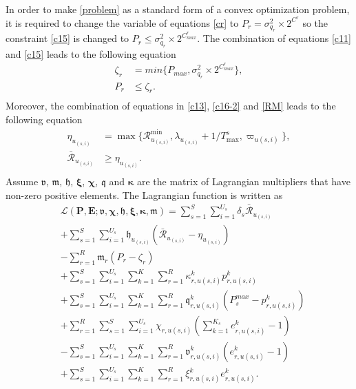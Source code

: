 \documentclass[lettersize,journal]{IEEEtran}
\begin{document}
In order to make \eqref{problem} as a standard form of a convex optimization problem, it is required to change the variable of equations \eqref{cr} to $P_r = \sigma_{q_r}^2\times 2^{C^r}$ so the constraint 
\eqref{c15} is changed to
 $P_r \leq \sigma_{q_r}^2\times 2^{C^r_{max}}$.
The combination of equations \eqref{c11} and \eqref{c15} leads to the following equation
\begin{equation} \label{pr11}
\begin{split}
\zeta_{r}&= min\{P_{max}, \sigma_{q_r}^2\times 2^{C^r_{max}} \}, \\
P_r &\leq  \zeta_{r}.\\
\end{split}
\end{equation} 
Moreover, the combination of equations in \eqref{c13}, \eqref{c16-2} and \eqref{RM} leads to the following equation
\begin{equation}\label{RConstr}
\begin{split}
\eta_{u_{(s,i)}}&= \max\{\mathcal{R}_{u_{(s,i)}}^{\min}, \lambda_{u_{(s,i)}}+1/T^s_{\max}, \varpi_{u(s,i)} \}, \\
\mathcal{\bar{R}}_{u_{(s,i)}} &\geq  \eta_{u_{(s,i)}}.\\
\end{split}
\end{equation}
Assume $\boldsymbol{\mathfrak{v}}$, $\boldsymbol{\mathfrak{m}}$, $\boldsymbol{\mathfrak{h}}$, $\boldsymbol{\xi}$, $\boldsymbol{\chi}$, $\boldsymbol{\mathfrak{q}}$ and $\boldsymbol{ \kappa}$ are the matrix of Lagrangian multipliers that have non-zero positive elements. The Lagrangian function is written as 
\begin{subequations}\label{lagrang}
\begin{alignat}{4}
&\mathcal{L}(\boldsymbol{P},\boldsymbol{E}; \boldsymbol{\mathfrak{v}}, \boldsymbol{\chi}, \boldsymbol{\mathfrak{h}}, \boldsymbol{ \xi}, \boldsymbol{ \kappa}, \boldsymbol{\mathfrak{m}})  = \sum\limits_{s=1}^{S} \sum\limits_{i=1}^{U_s}\delta_s\mathcal{\bar{R}}_{u_{(s,i)}}\\
&+\sum\limits_{s=1}^{S} \sum\limits_{i=1}^{U_s}\mathfrak{h}_{u_{(s,i)}} (\mathcal{\bar{R}}_{u_{(s,i)}}-\eta_{u_{(s,i)}})\\
&-  \sum\limits_{r=1}^{R} \mathfrak{m}_{r} (P_{r}- \zeta_r)\\
&+  \sum\limits_{s=1}^{S} \sum\limits_{i=1}^{U_s}\sum\limits_{k=1}^{K} \sum\limits_{r=1}^{R}\kappa^k_{r,u(s,i)}  p^k_{r,u(s,i)}\\
&+  \sum\limits_{s=1}^{S} \sum\limits_{i=1}^{U_s}\sum\limits_{k=1}^{K} \sum\limits_{r=1}^{R}\mathfrak{q}^k_{r,u(s,i)} (P^{max}_{s}- p^k_{r,u(s,i)})\\
&+ \sum\limits_{r=1}^{R}\sum\limits_{s=1}^{S} \sum\limits_{i=1}^{U_s}\chi_{r,u(s,i)}(\sum_{k =1}^{K_s} e^{k}_{r,u(s,i)} -1)\\
&-  \sum\limits_{s=1}^{S} \sum\limits_{i=1}^{U_s}\sum\limits_{k=1}^{K} \sum\limits_{r=1}^{R}\mathfrak{v}^{k}_{r,u(s,i)} (e^{k}_{r,u(s,i)} -1)\\
&+  \sum\limits_{s=1}^{S} \sum\limits_{i=1}^{U_s}\sum\limits_{k=1}^{K} \sum\limits_{r=1}^{R} \xi^{k}_{r,u(s,i)} e^{k}_{r,u(s,i)}.
\end{alignat}
\end{subequations}
\end{document}
